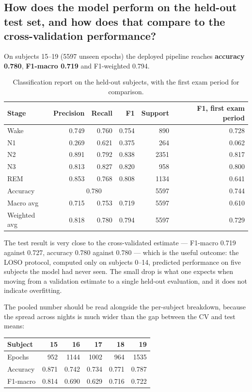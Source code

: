 \documentclass[11pt,a4paper]{article}
\newcommand{\num}[1]{#1}
\newcommand{\numrange}[2]{#1--#2}
\newcommand{\Q}[1]{\subsection*{#1}}
\begin{document}
\Q{How does the model perform on the held-out test set, and how does that compare to the
cross-validation performance?}

On subjects \numrange{15}{19} (\num{5597} unseen epochs) the deployed pipeline reaches
\textbf{accuracy \num{0.780}}, \textbf{F1-macro \num{0.719}} and F1-weighted \num{0.794}.

\begin{table}[htbp]
\centering\small
\caption{Classification report on the held-out subjects, with the first exam period for
         comparison.}
\label{tab:p2report}
\begin{tabular}{lrrrrr}
\toprule
Stage & Precision & Recall & F1 & Support & F1, first exam period \\
\midrule
Wake & 0.749 & 0.760 & 0.754 & 890  & 0.728 \\
N1   & 0.269 & 0.621 & 0.375 & 264  & 0.062 \\
N2   & 0.891 & 0.792 & 0.838 & 2351 & 0.817 \\
N3   & 0.813 & 0.827 & 0.820 & 958  & 0.800 \\
REM  & 0.853 & 0.768 & 0.808 & 1134 & 0.641 \\
\midrule
Accuracy    & \multicolumn{3}{c}{0.780} & 5597 & 0.744 \\
Macro avg   & 0.715 & 0.753 & 0.719 & 5597 & 0.610 \\
Weighted avg& 0.818 & 0.780 & 0.794 & 5597 & 0.729 \\
\bottomrule
\end{tabular}
\end{table}

The test result is very close to the cross-validated estimate --- F1-macro \num{0.719} against
\num{0.727}, accuracy \num{0.780} against \num{0.780} --- which is the useful outcome: the LOSO
protocol, computed only on subjects \numrange{0}{14}, predicted performance on five subjects the
model had never seen. The small drop is what one expects when moving from a validation estimate
to a single held-out evaluation, and it does not indicate overfitting.

The pooled number should be read alongside the per-subject breakdown, because the spread across
nights is much wider than the gap between the CV and test means:

\begin{center}\small
\begin{tabular}{lrrrrr}
\toprule
Subject & 15 & 16 & 17 & 18 & 19 \\
\midrule
Epochs   & 952 & 1144 & 1002 & 964 & 1535 \\
Accuracy & 0.871 & 0.742 & 0.734 & 0.771 & 0.787 \\
F1-macro & 0.814 & 0.690 & 0.629 & 0.716 & 0.722 \\
\bottomrule
\end{tabular}
\end{center}
\end{document}
